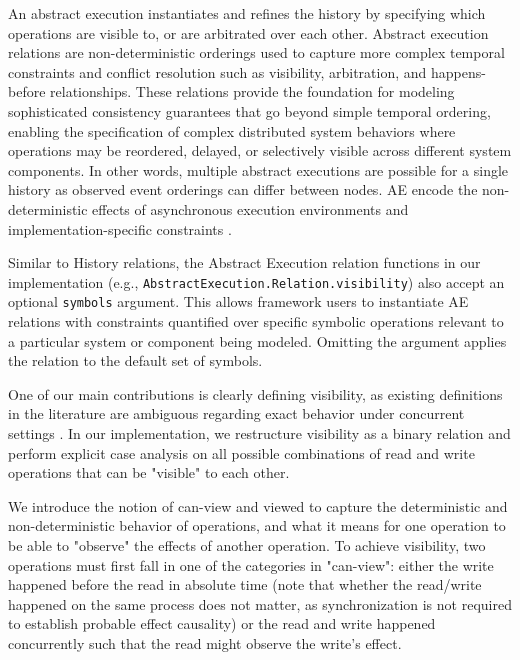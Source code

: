 An abstract execution instantiates and refines the history by
specifying which operations are visible to, or are arbitrated over
each other. Abstract execution relations are non-deterministic
orderings used to capture more complex temporal constraints and
conflict resolution such as visibility, arbitration, and
happens-before relationships. These relations provide the foundation
for modeling sophisticated consistency guarantees that go beyond
simple temporal ordering, enabling the specification of complex
distributed system behaviors where operations may be reordered,
delayed, or selectively visible across different system components.
In other words, multiple abstract executions are possible for a
single history as observed event orderings can differ between nodes.
AE encode the non-deterministic effects of asynchronous execution
environments and implementation-specific constraints
\cite{burckhardt2014principles} \cite{viotti2016consistency}.

Similar to History relations, the Abstract Execution relation
functions in our implementation (e.g.,
\texttt{AbstractExecution.Relation.visibility}) also accept an
optional \texttt{symbols} argument. This allows framework users to
instantiate AE relations with constraints quantified over specific
symbolic operations relevant to a particular system or component
being modeled. Omitting the argument applies the relation to the
default set of symbols.

One of our main contributions is clearly defining
visibility, as existing definitions in the literature are ambiguous
regarding exact behavior under concurrent
settings
\cite{viotti2016consistency,viotti2016towards,zhang2018building,ferreira2023antipode}.
In our implementation, we restructure visibility as a binary relation
and perform explicit case analysis on all possible combinations of
read and write operations that can be "visible" to each other.

We introduce the notion of can-view and viewed to capture the
deterministic and non-deterministic behavior of operations,
and what it means for one operation to be able to "observe"
the effects of another operation. To achieve visibility, two
operations must first fall in one of
the categories in "can-view": either the write happened before the read
in absolute time (note that whether the read/write happened on the
  same process does not matter, as synchronization
is not required to establish probable effect causality)
or the read and write happened concurrently such that the read might
observe the write's effect.

